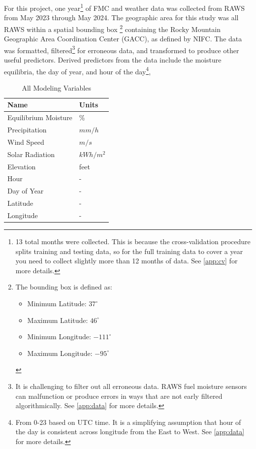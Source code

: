\documentclass[11pt]{article}%
\begin{document}
For this project, one year\footnote{13 total months were collected. This is because the cross-validation procedure splits training and testing data, so for the full training data to cover a year you need to collect slightly more than 12 months of data. See \ref{app:cv} for more details.} of FMC and weather data was collected from RAWS from May 2023 through May 2024. The geographic area for this study was all RAWS within a spatial bounding box
\footnote{
The bounding box is defined as: 
\begin{itemize}
    \item Minimum Latitude: $37^\circ$\\
    \item Maximum Latitude: $46^\circ$\\
    \item Minimum Longitude: $-111^\circ$\\
    \item Maximum Longitude: $-95^\circ$ 
\end{itemize}
} 
containing the Rocky Mountain Geographic Area Coordination Center (GACC), as defined by NIFC.\cite{NIFC-GACC} The data was formatted,  filtered\footnote{It is challenging to filter out all erroneous data. RAWS fuel moisture sensors can malfunction or produce errors in ways that are not early filtered algorithmically. See \ref{app:data} for more details.} for erroneous data, and transformed to produce other useful predictors. Derived predictors from the data include the moisture equilibria, the day of year, and hour of the day\footnote{From 0-23 based on UTC time. It is a simplifying assumption that hour of the day is consistent across longitude from the East to West. See \ref{app:data} for more details.},

\begin{table}[ht]
\centering
\caption{All Modeling Variables}
\label{tab:all_vars}
\begin{tabular}{|l|l|}
\hline
\textbf{Name}           & \textbf{Units} \\  \hline
Equilibrium Moisture    & \%             \\ \hline
Precipitation           & $mm/h$           \\ \hline
Wind Speed              & $m/s$            \\ \hline
Solar Radiation         & $kWh/m^2$         \\ \hline
Elevation         & feet         \\ 
\hline
Hour                    & -              \\ 
\hline
Day of Year             & -              \\ 
\hline
Latitude                & -              \\ 
\hline
Longitude               & -              \\ 
\hline

\end{tabular}
\end{table}
\end{document}
